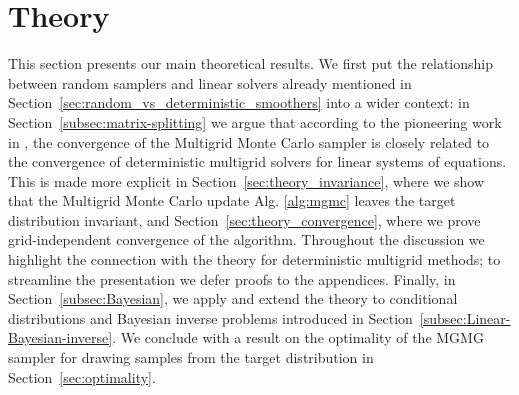 \documentclass[11pt,english]{article}
\theoremstyle{plain}
\theoremstyle{plain}
\theoremstyle{plain}
\theoremstyle{plain}
\numberwithin{equation}{section}
\begin{document}
\section{Theory\label{sec:theory}}
This section presents our main theoretical results. We first put the relationship between random samplers and linear solvers already mentioned in Section~\ref{sec:random_vs_deterministic_smoothers} into a wider context: in Section~\ref{subsec:matrix-splitting} we argue that according to the pioneering work in \cite{goodman1989multigrid,Fox.C_Parker_2017_AcceleratedGibbsSampling}, the convergence of the Multigrid Monte Carlo sampler is closely related to the convergence of deterministic multigrid solvers for linear systems of equations. This is made more explicit in Section~\ref{sec:theory_invariance}, where we show that the Multigrid Monte Carlo update Alg. \ref{alg:mgmc} leaves the target distribution invariant, and Section~\ref{sec:theory_convergence}, where we prove grid-independent convergence of the algorithm. Throughout the discussion we highlight the connection with the theory for deterministic multigrid methods; to streamline the presentation we defer proofs to the appendices. Finally, in Section~\ref{subsec:Bayesian}, we apply and extend the theory to conditional distributions and Bayesian inverse problems introduced in Section~\ref{subsec:Linear-Bayesian-inverse}. We conclude with a result on the optimality of the MGMG sampler for drawing samples from the target distribution in Section~\ref{sec:optimality}.
\end{document}
